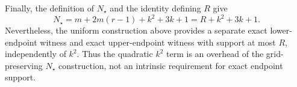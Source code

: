 Finally, the definition of \(N_\star\) and the identity defining \(R\) give
\[
N_\star
=m+2m(r-1)+k^2+3k+1
=R+k^2+3k+1.
\]
Nevertheless, the uniform construction above provides a separate exact lower-endpoint witness and exact upper-endpoint witness with support at most \(R\), independently of \(k^2\).  Thus the quadratic \(k^2\) term is an overhead of the grid-preserving \(N_\star\) construction, not an intrinsic requirement for exact endpoint support.
